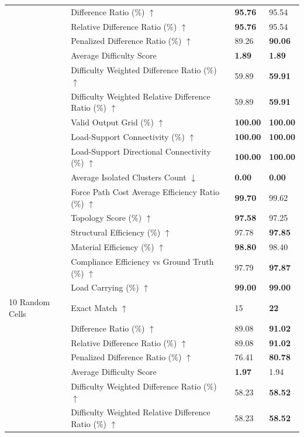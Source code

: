 \begin{table}[!h]
{\begin{tabular}{llll}
 & Difference Ratio (\%) $\uparrow$ & \textbf{95.76} & 95.54 \\
 & Relative Difference Ratio (\%) $\uparrow$ & \textbf{95.76} & 95.54 \\
 & Penalized Difference Ratio (\%) $\uparrow$ & 89.26 & \textbf{90.06} \\
 & Average Difficulty Score & \textbf{1.89} & \textbf{1.89} \\
 & Difficulty Weighted Difference Ratio (\%) $\uparrow$ & 59.89 & \textbf{59.91} \\
 & Difficulty Weighted Relative Difference Ratio (\%) $\uparrow$ & 59.89 & \textbf{59.91} \\
 & Valid Output Grid (\%) $\uparrow$ & \textbf{100.00} & \textbf{100.00} \\
 & Load-Support Connectivity (\%) $\uparrow$ & \textbf{100.00} & \textbf{100.00} \\
 & Load-Support Directional Connectivity (\%) $\uparrow$ & \textbf{100.00} & \textbf{100.00} \\
 & Average Isolated Clusters Count $\downarrow$ & \textbf{0.00} & \textbf{0.00} \\
 & Force Path Cost Average Efficiency Ratio (\%) $\uparrow$ & \textbf{99.70} & 99.62 \\
 & Topology Score (\%) $\uparrow$ & \textbf{97.58} & 97.25 \\
 & Structural Efficiency (\%) $\uparrow$ & 97.78 & \textbf{97.85} \\
 & Material Efficiency (\%) $\uparrow$ & \textbf{98.80} & 98.40 \\
 & Compliance Efficiency vs Ground Truth (\%) $\uparrow$ & 97.79 & \textbf{97.87} \\
 & Load Carrying (\%) $\uparrow$ & \textbf{99.00} & \textbf{99.00} \\
10 Random Cells & Exact Match $\uparrow$ & 15 & \textbf{22} \\
 & Difference Ratio (\%) $\uparrow$ & 89.08 & \textbf{91.02} \\
 & Relative Difference Ratio (\%) $\uparrow$ & 89.08 & \textbf{91.02} \\
 & Penalized Difference Ratio (\%) $\uparrow$ & 76.41 & \textbf{80.78} \\
 & Average Difficulty Score & \textbf{1.97} & 1.94 \\
 & Difficulty Weighted Difference Ratio (\%) $\uparrow$ & 58.23 & \textbf{58.52} \\
 & Difficulty Weighted Relative Difference Ratio (\%) $\uparrow$ & 58.23 & \textbf{58.52} \\

\end{tabular}}
\end{table}
